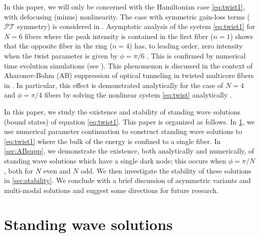 \documentclass[reprint, amsmath,amssymb,aps]{revtex4-2}
\begin{document}
In this paper, we will only be concerned with the Hamiltonian case \cref{eq:twist1}, with defocusing (minus) nonlinearity. The case with symmetric gain-loss terms ($\mathcal{PT}$ symmetry) is considered in \cite{castro2016}. Asymptotic analysis of the system \cref{eq:twist1} for $N=6$ fibers where the peak intensity is contained in the first fiber ($n=1$) shows that the opposite fiber in the ring ($n=4$) has, to leading order, zero intensity when the twist parameter is given by $\phi = \pi/6$ \cite{castro2016}. This is confirmed by numerical time evolution simulations (see \cite[Figures 4 and 5]{castro2016}). This phenomenon is discussed in the context of Aharonov-Bohm (AB) suppression of optical tunneling in twisted multicore fibers in \cite{Parto2017,Parto2019}. In particular, this effect is demonstrated analytically for the case of $N = 4$ and $\phi = \pi/4$ fibers by solving the nonlinear system \cref{eq:twist} analytically \cite{Parto2019}. 

In this paper, we study the existence and stability of standing wave solutions (bound states) of equation \cref{eq:twist1}. This paper is organized as follows. In \cref{sec:standingwave}, we use numerical parameter continuation to construct standing wave solutions to \cref{eq:twist1} where the bulk of the energy is confined to a single fiber. In \cref{sec:ABsupp}, we demonstrate the existence, both analytically and numerically, of standing wave solutions which have a single dark node; this occurs when $\phi = \pi/N$, both for $N$ even and $N$ odd. We then investigate the stability of these solutions in \cref{sec:stability}. We conclude with a brief discussion of asymmetric variants and multi-modal solutions and suggest some directions for future research.

\section{Standing wave solutions}\label{sec:standingwave}
\end{document}
